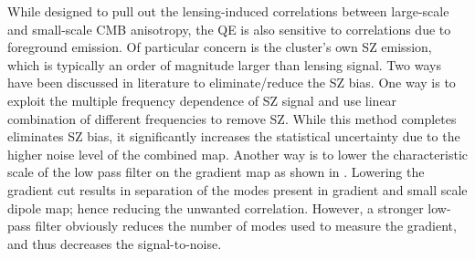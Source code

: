 While designed to pull out the lensing-induced correlations between large-scale and small-scale CMB anisotropy, the QE is also sensitive to  correlations due to foreground emission.
Of particular concern is  the cluster's own SZ emission, which is typically an order of magnitude larger than lensing signal. 
Two ways have been discussed in literature to eliminate/reduce the SZ bias.
One way is to exploit the multiple frequency dependence of SZ signal and use linear combination of different frequencies to remove SZ.
While this method completes eliminates SZ bias, it significantly increases the statistical uncertainty due to the higher noise level of the combined map.
Another way is to lower the characteristic scale of the low pass filter on the gradient map as shown in  \citet{hu07}.
Lowering the gradient cut results in separation of the modes present in gradient and small scale dipole map; hence reducing the unwanted correlation. 
However, a stronger low-pass filter obviously reduces the number of modes used to measure the gradient, and thus decreases the signal-to-noise. 

